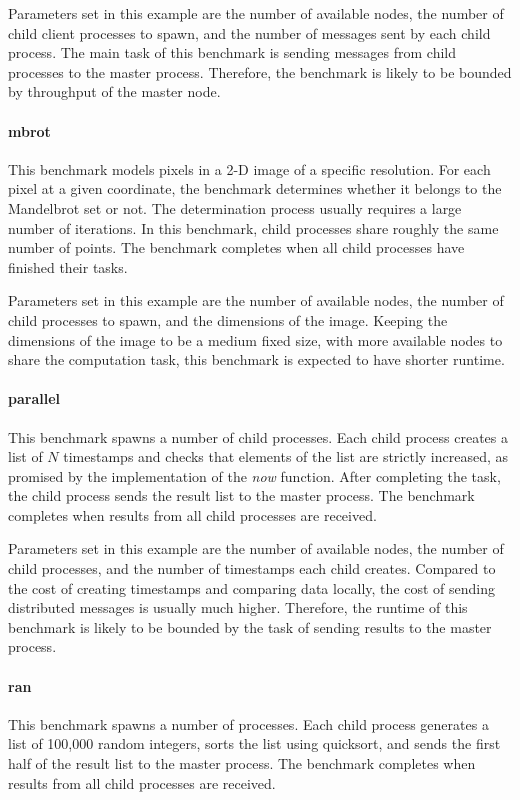 Parameters set in this example are the number of available nodes, the number 
of child client processes to spawn, and the number of messages sent by each 
child process. The main task of this benchmark is sending messages from child 
processes to the master process. Therefore, the benchmark is likely to be bounded by throughput of the master node.

\paragraph{mbrot} This benchmark models pixels in a 2-D image of a specific 
resolution.  For each pixel at a given coordinate, the benchmark determines 
whether it belongs to the Mandelbrot set \citep{wiki:mandelbrot} or not. The 
determination process usually requires a large number of iterations.  In this 
benchmark, child processes share roughly the same number of points.  The 
benchmark completes when all child processes have finished their tasks.

Parameters set in this example are the number of available nodes, the number 
of child processes to spawn, and the dimensions of the image.  Keeping the 
dimensions of the image to be a medium fixed size, with more available nodes to 
share the computation task, this benchmark is expected to have shorter runtime.




\paragraph{parallel}  This benchmark spawns a number of child processes.  Each 
child process creates a list of $N$ timestamps and checks that elements of the 
list are strictly increased, as promised by the implementation of the {\it now} 
function.  After completing the task, the child process sends the result list 
to the master process.  The benchmark completes when results from all child 
processes are received.

Parameters set in this example are the number of available nodes, the number of 
child processes, and the number of timestamps each child creates. Compared to 
the cost of creating timestamps and comparing data locally, the cost of sending 
distributed messages is usually much higher.  Therefore, the runtime of this 
benchmark is likely to be bounded by the task of sending results to the 
master process.




\paragraph{ran}  This benchmark spawns a number of processes.  Each child 
process generates a list of 100,000 random integers, sorts the list using 
quicksort, and sends the first half of the result list to the master process.  
The benchmark completes when results from all child processes are received.

